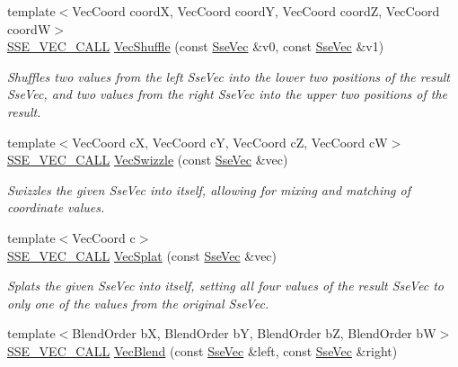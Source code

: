 {\bf }\par
\begin{DoxyCompactItemize}
\item 
{\footnotesize template$<$Vec\+Coord coord\+X, Vec\+Coord coord\+Y, Vec\+Coord coord\+Z, Vec\+Coord coord\+W$>$ }\\\hyperlink{ssevec__math__defs_8h_a97454f977a5281455cecacce1e8ba670}{S\+S\+E\+\_\+\+V\+E\+C\+\_\+\+C\+A\+L\+L} \hyperlink{group___s_i_m_d_vec_math_ga7b898d302ff9f1463df60c1ca7f03360}{Vec\+Shuffle} (const \hyperlink{namespacegofxmath_a634570ddcd2496053ee966227080e02f}{Sse\+Vec} \&v0, const \hyperlink{namespacegofxmath_a634570ddcd2496053ee966227080e02f}{Sse\+Vec} \&v1)
\begin{DoxyCompactList}\small\item\em Shuffles two values from the left Sse\+Vec into the lower two positions of the result Sse\+Vec, and two values from the right Sse\+Vec into the upper two positions of the result. \end{DoxyCompactList}\item 
{\footnotesize template$<$Vec\+Coord c\+X, Vec\+Coord c\+Y, Vec\+Coord c\+Z, Vec\+Coord c\+W$>$ }\\\hyperlink{ssevec__math__defs_8h_a97454f977a5281455cecacce1e8ba670}{S\+S\+E\+\_\+\+V\+E\+C\+\_\+\+C\+A\+L\+L} \hyperlink{group___s_i_m_d_vec_math_ga301067d1f7d26034d5b23f8b1d419856}{Vec\+Swizzle} (const \hyperlink{namespacegofxmath_a634570ddcd2496053ee966227080e02f}{Sse\+Vec} \&vec)
\begin{DoxyCompactList}\small\item\em Swizzles the given Sse\+Vec into itself, allowing for mixing and matching of coordinate values. \end{DoxyCompactList}\item 
{\footnotesize template$<$Vec\+Coord c$>$ }\\\hyperlink{ssevec__math__defs_8h_a97454f977a5281455cecacce1e8ba670}{S\+S\+E\+\_\+\+V\+E\+C\+\_\+\+C\+A\+L\+L} \hyperlink{group___s_i_m_d_vec_math_ga11f32c02b44ae471bedaae3ab1812e1d}{Vec\+Splat} (const \hyperlink{namespacegofxmath_a634570ddcd2496053ee966227080e02f}{Sse\+Vec} \&vec)
\begin{DoxyCompactList}\small\item\em Splats the given Sse\+Vec into itself, setting all four values of the result Sse\+Vec to only one of the values from the original Sse\+Vec. \end{DoxyCompactList}\item 
{\footnotesize template$<$Blend\+Order b\+X, Blend\+Order b\+Y, Blend\+Order b\+Z, Blend\+Order b\+W$>$ }\\\hyperlink{ssevec__math__defs_8h_a97454f977a5281455cecacce1e8ba670}{S\+S\+E\+\_\+\+V\+E\+C\+\_\+\+C\+A\+L\+L} \hyperlink{group___s_i_m_d_vec_math_ga48b58f474383827ced71edfdf5bb0f8c}{Vec\+Blend} (const \hyperlink{namespacegofxmath_a634570ddcd2496053ee966227080e02f}{Sse\+Vec} \&left, const \hyperlink{namespacegofxmath_a634570ddcd2496053ee966227080e02f}{Sse\+Vec} \&right)

\end{DoxyCompactItemize}

